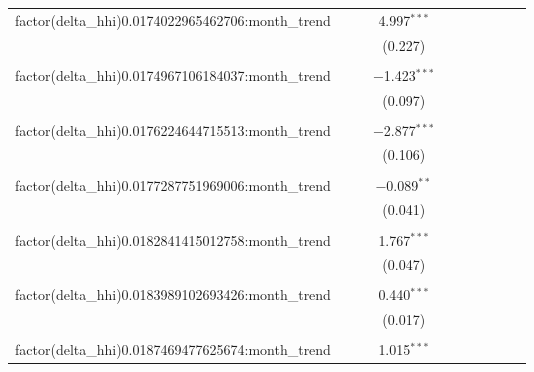 \begin{table}[H]
{\begin{tabular}{@{\extracolsep{5pt}}lccccccccc}
  factor(delta\_hhi)0.0174022965462706:month\_trend &  &  & 4.997$^{***}$ &  &  &  &  &  &  \\  

   &  &  & (0.227) &  &  &  &  &  &  \\  

   & & & & & & & & & \\  

  factor(delta\_hhi)0.0174967106184037:month\_trend &  &  & $-$1.423$^{***}$ &  &  &  &  &  &  \\  

   &  &  & (0.097) &  &  &  &  &  &  \\  

   & & & & & & & & & \\  

  factor(delta\_hhi)0.0176224644715513:month\_trend &  &  & $-$2.877$^{***}$ &  &  &  &  &  &  \\  

   &  &  & (0.106) &  &  &  &  &  &  \\  

   & & & & & & & & & \\  

  factor(delta\_hhi)0.0177287751969006:month\_trend &  &  & $-$0.089$^{**}$ &  &  &  &  &  &  \\  

   &  &  & (0.041) &  &  &  &  &  &  \\  

   & & & & & & & & & \\  

  factor(delta\_hhi)0.0182841415012758:month\_trend &  &  & 1.767$^{***}$ &  &  &  &  &  &  \\  

   &  &  & (0.047) &  &  &  &  &  &  \\  

   & & & & & & & & & \\  

  factor(delta\_hhi)0.0183989102693426:month\_trend &  &  & 0.440$^{***}$ &  &  &  &  &  &  \\  

   &  &  & (0.017) &  &  &  &  &  &  \\  

   & & & & & & & & & \\  

  factor(delta\_hhi)0.0187469477625674:month\_trend &  &  & 1.015$^{***}$ &  &  &  &  &  &  \\  


\end{tabular}}
\end{table}
